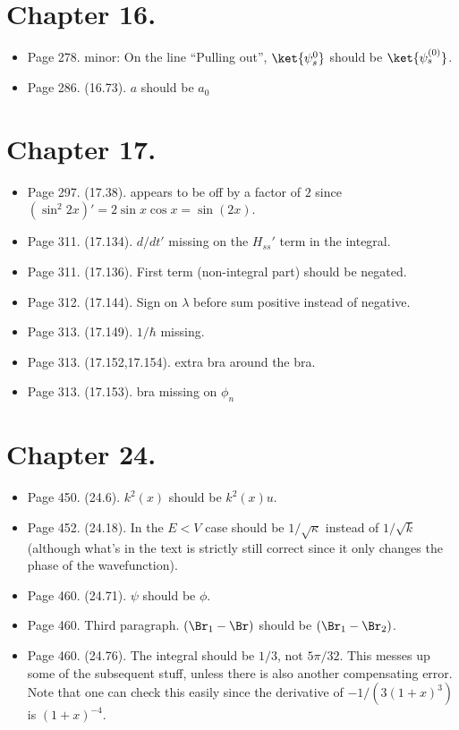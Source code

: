\section{Chapter 16.}
\begin{itemize}
\item Page 278.  minor: On the line ``Pulling out'', $\ket{\psi_s^0}$ should be $\ket{\psi_s^{(0)}}$.
\item Page 286.  (16.73).  $a$ should be $a_0$
\end{itemize}

\section{Chapter 17.}
\begin{itemize}
\item Page 297.  (17.38).   appears to be off by a factor of $2$ since $(\sin^2 2x)' = 2 \sin x \cos x = \sin(2 x)$.
\item Page 311.  (17.134).  $d/dt'$ missing on the $H_{ss}'$ term in the integral.
\item Page 311.  (17.136).  First term (non-integral part) should be negated.
\item Page 312.  (17.144).  Sign on $\lambda$ before sum positive instead of negative.
\item Page 313.  (17.149).  $1/\hbar$ missing.
\item Page 313.  (17.152,17.154).  extra bra around the bra.
\item Page 313.  (17.153).  bra missing on $\phi_n$
\end{itemize}

\section{Chapter 24.}
\begin{itemize}
\item Page 450.  (24.6).  $k^2(x)$ should be $k^2(x) u$.
\item Page 452.  (24.18).  In the $E < V$ case should be $1/\sqrt{\kappa}$ instead of $1/\sqrt{k}$ (although what's in the text is strictly still correct since it only changes the phase of the wavefunction).
\item Page 460.  (24.71).  $\psi$ should be $\phi$.
\item Page 460.  Third paragraph.  $(\Br_1 - \Br)$ should be $(\Br_1 - \Br_2)$.
\item Page 460.  (24.76).  The integral should be $1/3$, not $5 \pi/32$.  This messes up some of the subsequent stuff, unless there is also another compensating error.  Note that one can check this easily since the derivative of $-1/(3 (1+x)^3)$ is $(1 + x)^{-4}$.
\end{itemize}

